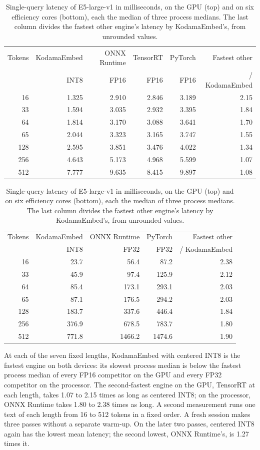 \documentclass[10pt]{article}
\begin{document}
\begin{table}[t]
\centering
\setlength{\tabcolsep}{5pt}
\caption{Single-query latency of E5-large-v1 in milliseconds, on the GPU
(top) and on six efficiency cores (bottom), each the median of three process
medians. The last column divides the fastest other engine's latency by
KodamaEmbed's, from unrounded values.}
\label{tab:latency}
\begin{tabular}{rrrrrr}
\toprule
Tokens & KodamaEmbed & ONNX Runtime & TensorRT & PyTorch & Fastest other \\
 & INT8 & FP16 & FP16 & FP16 & / KodamaEmbed \\
\midrule
16 & 1.325 & 2.910 & 2.846 & 3.189 & 2.15 \\
33 & 1.594 & 3.035 & 2.932 & 3.395 & 1.84 \\
64 & 1.814 & 3.170 & 3.088 & 3.641 & 1.70 \\
65 & 2.044 & 3.323 & 3.165 & 3.747 & 1.55 \\
128 & 2.595 & 3.851 & 3.476 & 4.022 & 1.34 \\
256 & 4.643 & 5.173 & 4.968 & 5.599 & 1.07 \\
512 & 7.777 & 9.635 & 8.415 & 9.897 & 1.08 \\
\bottomrule
\end{tabular}

\vspace{2ex}
\begin{tabular}{rrrrr}
\toprule
Tokens & KodamaEmbed & ONNX Runtime & PyTorch & Fastest other \\
 & INT8 & FP32 & FP32 & / KodamaEmbed \\
\midrule
16 & 23.7 & 56.4 & 87.2 & 2.38 \\
33 & 45.9 & 97.4 & 125.9 & 2.12 \\
64 & 85.4 & 173.1 & 293.1 & 2.03 \\
65 & 87.1 & 176.5 & 294.2 & 2.03 \\
128 & 183.7 & 337.6 & 446.4 & 1.84 \\
256 & 376.9 & 678.5 & 783.7 & 1.80 \\
512 & 771.8 & 1466.2 & 1474.6 & 1.90 \\
\bottomrule
\end{tabular}
\end{table}

At each of the seven fixed lengths, KodamaEmbed with centered INT8 is the
fastest engine on both devices: its slowest process median is below the
fastest process median
of every FP16 competitor on the GPU and every FP32 competitor on the
processor. The second-fastest engine on the GPU, TensorRT at each length,
takes 1.07 to 2.15 times as long as centered INT8; on the processor, ONNX
Runtime takes 1.80 to 2.38 times as long.
A second measurement runs one text of each length from 16 to 512 tokens in a
fixed order. A fresh session makes three passes without a separate warm-up.
On the later two passes, centered INT8 again has the lowest mean latency;
the second lowest, ONNX Runtime's, is 1.27 times it.
\end{document}

